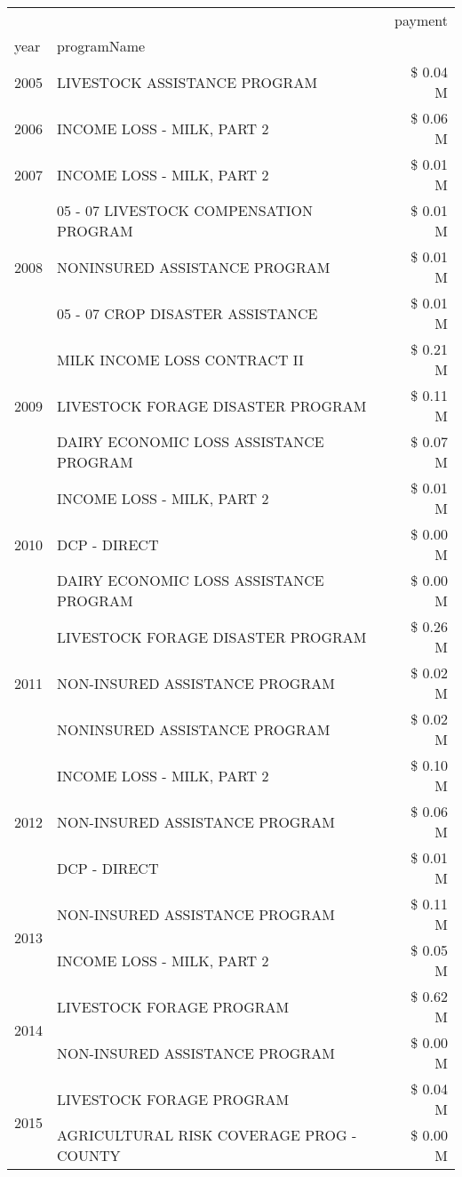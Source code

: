 \begin{tabular}{llr}
\toprule
 &  & payment \\
year & programName &  \\
\midrule
2005 & LIVESTOCK ASSISTANCE PROGRAM & \$ 0.04 M \\
\cline{1-3}
2006 & INCOME LOSS - MILK, PART 2 & \$ 0.06 M \\
\cline{1-3}
2007 & INCOME LOSS - MILK, PART 2 & \$ 0.01 M \\
\cline{1-3}
\multirow[t]{3}{*}{2008} & 05 - 07 LIVESTOCK COMPENSATION PROGRAM & \$ 0.01 M \\
 & NONINSURED ASSISTANCE PROGRAM & \$ 0.01 M \\
 & 05 - 07 CROP DISASTER ASSISTANCE & \$ 0.01 M \\
\cline{1-3}
\multirow[t]{3}{*}{2009} & MILK INCOME LOSS CONTRACT II & \$ 0.21 M \\
 & LIVESTOCK FORAGE DISASTER  PROGRAM & \$ 0.11 M \\
 & DAIRY ECONOMIC LOSS ASSISTANCE PROGRAM & \$ 0.07 M \\
\cline{1-3}
\multirow[t]{3}{*}{2010} & INCOME LOSS - MILK, PART 2 & \$ 0.01 M \\
 & DCP - DIRECT & \$ 0.00 M \\
 & DAIRY ECONOMIC LOSS ASSISTANCE PROGRAM & \$ 0.00 M \\
\cline{1-3}
\multirow[t]{3}{*}{2011} & LIVESTOCK FORAGE DISASTER PROGRAM & \$ 0.26 M \\
 & NON-INSURED ASSISTANCE PROGRAM & \$ 0.02 M \\
 & NONINSURED ASSISTANCE PROGRAM & \$ 0.02 M \\
\cline{1-3}
\multirow[t]{3}{*}{2012} & INCOME LOSS - MILK, PART 2 & \$ 0.10 M \\
 & NON-INSURED ASSISTANCE PROGRAM & \$ 0.06 M \\
 & DCP - DIRECT & \$ 0.01 M \\
\cline{1-3}
\multirow[t]{2}{*}{2013} & NON-INSURED ASSISTANCE PROGRAM & \$ 0.11 M \\
 & INCOME LOSS - MILK, PART 2 & \$ 0.05 M \\
\cline{1-3}
\multirow[t]{2}{*}{2014} & LIVESTOCK FORAGE PROGRAM & \$ 0.62 M \\
 & NON-INSURED ASSISTANCE PROGRAM & \$ 0.00 M \\
\cline{1-3}
\multirow[t]{2}{*}{2015} & LIVESTOCK FORAGE PROGRAM & \$ 0.04 M \\
 & AGRICULTURAL RISK COVERAGE PROG - COUNTY & \$ 0.00 M \\

\end{tabular}
